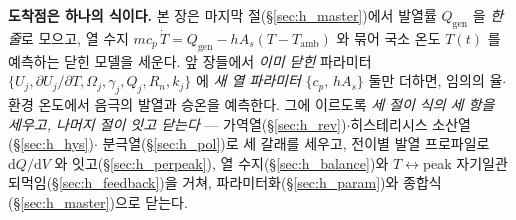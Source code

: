 \documentclass[11pt,a4paper]{article}
\newcommand{\dd}{\mathrm{d}}
\newcommand{\gen}{\mathrm{gen}}
\newcommand{\amb}{\mathrm{amb}}
\begin{document}
\textbf{도착점은 하나의 식이다.} 본 장은 마지막 절(\S\ref{sec:h_master})에서 발열률 $Q_\gen$ 을 \emph{한 줄}로
모으고, 열 수지 $m c_p\,\dot T=Q_\gen-hA_s(T-T_\amb)$ 와 묶어 국소 온도 $T(t)$ 를 예측하는 닫힌 모델을 세운다. 앞
장들에서 \emph{이미 닫힌} 파라미터 $\{U_j,\partial U_j/\partial T,\Omega_j,\gamma_j,Q_j,R_n,k_j\}$ 에 \emph{새 열
파라미터} $\{c_p,\,hA_s\}$ 둘만 더하면, 임의의 율$\cdot$환경 온도에서 음극의 발열과 승온을 예측한다. 그에 이르도록
\emph{세 절이 식의 세 항을 세우고, 나머지 절이 잇고 닫는다} — 가역열(\S\ref{sec:h_rev})$\cdot$히스테리시스 소산열(\S\ref{sec:h_hys})$\cdot$
분극열(\S\ref{sec:h_pol})로 세 갈래를 세우고, 전이별 발열 프로파일로 $\dd Q/\dd V$ 와 잇고(\S\ref{sec:h_perpeak}),
열 수지(\S\ref{sec:h_balance})와 $T\leftrightarrow$peak 자기일관 되먹임(\S\ref{sec:h_feedback})을 거쳐,
파라미터화(\S\ref{sec:h_param})와 종합식(\S\ref{sec:h_master})으로 닫는다.

\tableofcontents
\newpage

\end{document}
